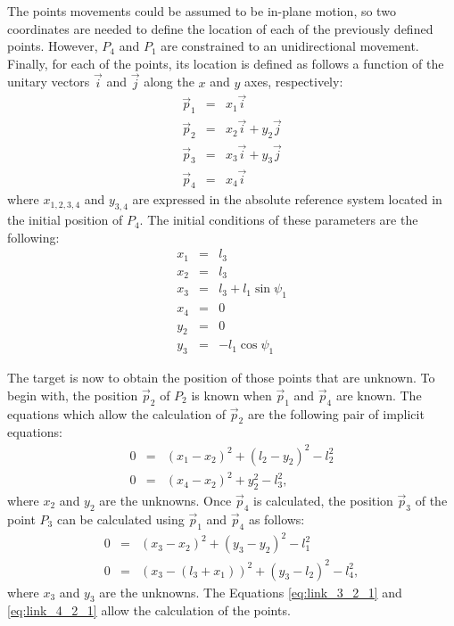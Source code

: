 
    The points movements could be assumed to be in-plane motion, so two coordinates are needed to define the location of each of the previously defined points. However, $P_4$ and $P_1$ are constrained to an unidirectional movement. Finally, for each of the points, its location is defined as follows a function of the unitary vectors $\vec{i}$ and $\vec{j}$ along the $x$ and $y$ axes, respectively:
    \begin{eqnarray}
      \vec{p}_1 &=& x_1 \vec{i} \nonumber \\
      \vec{p}_2 &=& x_2 \vec{i} + y_2 \vec{j} \nonumber \\
      \vec{p}_3 &=& x_3 \vec{i} + y_3 \vec{j} \nonumber \\
      \vec{p}_4 &=& x_4 \vec{i}
    \end{eqnarray}
    \noindent
    where $x_{1,2,3,4}$ and $y_{3,4}$ are expressed in the absolute reference system located in the initial position of $P_4$. The initial conditions of these parameters are the following:
    \begin{eqnarray}
      x_1 &=& l_3 \nonumber \\
      x_2 &=& l_3 \nonumber \\
      x_3 &=& l_3 + l_1 \sin \psi_1 \nonumber \\
      x_4 &=& 0 \nonumber \\
      y_2 &=& 0 \nonumber \\
      y_3 &=& - l_1 \cos \psi_1
    \end{eqnarray}

    The target is now to obtain the position of those points that are unknown. To begin with, the position $\vec{p}_2$ of $P_2$ is known when $\vec{p}_1$ and $\vec{p}_4$ are known. The equations which allow the calculation of $\vec{p}_2$ are the following pair of implicit equations:
    \begin{eqnarray}
      0 &=& (x_1 - x_2)^2 + (l_2 - y_2)^2 - l_2^2 \nonumber \\
      0 &=& (x_4 - x_2)^2 + y_2^2 - l_3^2,
      \label{eq:link_4_2_1}
    \end{eqnarray}
    \noindent
    where $x_2$ and $y_2$ are the unknowns. Once $\vec{p}_4$ is calculated, the position $\vec{p}_3$ of the point $P_3$ can be calculated using $\vec{p}_1$ and $\vec{p}_4$ as follows:
    \begin{eqnarray}
      0 &=& (x_3 - x_2)^2 + (y_3 - y_2)^2 - l_1^2 \nonumber \\
      0 &=& (x_3 - (l_3 +x_1))^2 + (y_3 - l_2)^2 - l_4^2,
      \label{eq:link_3_2_1}
    \end{eqnarray}
    \noindent
    where $x_3$ and $y_3$ are the unknowns. The Equations \ref{eq:link_3_2_1} and \ref{eq:link_4_2_1} allow the calculation of the points.

